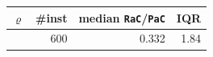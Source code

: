 \begin{tabular}{@{}rrrr@{}}
\toprule
$\varrho$ & \#inst & median \texttt{RaC}/\texttt{PaC} & IQR \\
\midrule
 & 600 & 0.332 & 1.84 \\
\bottomrule
\end{tabular}
